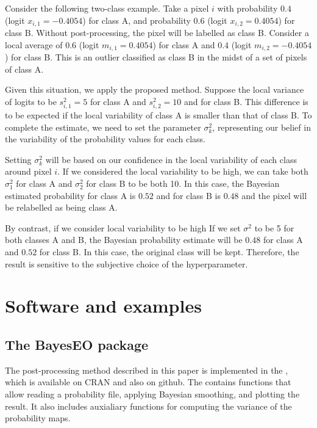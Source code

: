 \documentclass[
  shortnames]{jss}
\begin{document}
Consider the following two-class example. Take a pixel \(i\) with probability \(0.4\) (logit \(x_{i,1} = -0.4054\)) for class A, and probability \(0.6\) (logit \(x_{i,2} = 0.4054\)) for class B. Without post-processing, the pixel will be labelled as class B. Consider a local average of \(0.6\) (logit \(m_{i,1} = 0.4054\)) for class A and \(0.4\) (logit \(m_{i,2} = -0.4054\)) for class B. This is an outlier classified as class B in the midst of a set of pixels of class A.

Given this situation, we apply the proposed method. Suppose the local variance of logits to be \(s^2_{i,1} = 5\) for class A and \(s^2_{i,2} = 10\) and for class B. This difference is to be expected if the local variability of class A is smaller than that of class B. To complete the estimate, we need to set the parameter \(\sigma^2_{k}\), representing our belief in the variability of the probability values for each class.

Setting \(\sigma^2_{k}\) will be based on our confidence in the local variability of each class around pixel \({i}\). If we considered the local variability to be high, we can take both \(\sigma^2_1\) for class A and \(\sigma^2_2\) for class B to be both 10. In this case, the Bayesian estimated probability for class A is \(0.52\) and for class B is \(0.48\) and the pixel will be relabelled as being class A.

By contrast, if we consider local variability to be high If we set \(\sigma^2\) to be 5 for both classes A and B, the Bayesian probability estimate will be \(0.48\) for class A and \(0.52\) for class B. In this case, the original class will be kept. Therefore, the result is sensitive to the subjective choice of the hyperparameter.

\section{Software and examples}\label{software-and-examples}

\subsection{The BayesEO package}\label{the-bayeseo-package}

The post-processing method described in this paper is implemented in the  , which is available on CRAN and also on github. The  contains functions that allow reading a probability file, applying Bayesian smoothing, and plotting the result. It also includes auxialiary functions for computing the variance of the probability maps.
\end{document}
